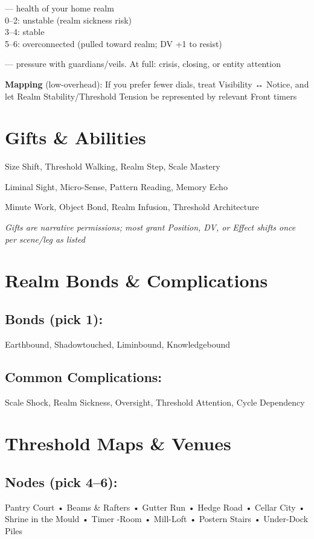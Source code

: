 \documentclass[11pt]{book}
\begin{document}
 --- health of your home realm \\
0--2: unstable (realm sickness risk) \\
3--4: stable \\
5--6: overconnected (pulled toward realm; DV +1 to resist)

 --- pressure with guardians/veils. At full: crisis, closing, or entity attention

\textbf{Mapping} (low-overhead): If you prefer fewer dials, treat Visibility ↔ Notice, and let Realm Stability/Threshold Tension be represented by relevant Front timers

\section{Gifts \& Abilities}
Size Shift, Threshold Walking, Realm Step, Scale Mastery

Liminal Sight, Micro-Sense, Pattern Reading, Memory Echo

Minute Work, Object Bond, Realm Infusion, Threshold Architecture

\textit{Gifts are narrative permissions; most grant Position, DV, or Effect shifts once per scene/leg as listed}

\section{Realm Bonds \& Complications}
\subsection*{Bonds (pick 1):}
Earthbound, Shadowtouched, Liminbound, Knowledgebound

\subsection*{Common Complications:}
Scale Shock, Realm Sickness, Oversight, Threshold Attention, Cycle Dependency

\section{Threshold Maps \& Venues}
\subsection*{Nodes (pick 4--6):}
Pantry Court • Beams \& Rafters • Gutter Run • Hedge Road • Cellar City • Shrine in the Mould • Timer -Room • Mill-Loft • Postern Stairs • Under-Dock Piles
\end{document}
